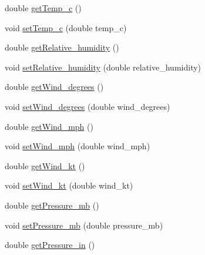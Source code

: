 \begin{DoxyCompactItemize}
\item 
double \hyperlink{classgov_1_1fnal_1_1ppd_1_1dd_1_1xml_1_1news_1_1current__observation_a09ac6676e3d02df8ddd1f7d01f4ee651}{get\-Temp\-\_\-c} ()
\item 
void \hyperlink{classgov_1_1fnal_1_1ppd_1_1dd_1_1xml_1_1news_1_1current__observation_a356c98dc1f0532700a57d135f8b9e1d1}{set\-Temp\-\_\-c} (double temp\-\_\-c)
\item 
double \hyperlink{classgov_1_1fnal_1_1ppd_1_1dd_1_1xml_1_1news_1_1current__observation_a3d00cbaf006d9ebf02333b42a9e37a81}{get\-Relative\-\_\-humidity} ()
\item 
void \hyperlink{classgov_1_1fnal_1_1ppd_1_1dd_1_1xml_1_1news_1_1current__observation_ac4d2748967563c32d98e4d6ab8bdd26a}{set\-Relative\-\_\-humidity} (double relative\-\_\-humidity)
\item 
double \hyperlink{classgov_1_1fnal_1_1ppd_1_1dd_1_1xml_1_1news_1_1current__observation_a68e1e24f506515463ee669410a5e5dd2}{get\-Wind\-\_\-degrees} ()
\item 
void \hyperlink{classgov_1_1fnal_1_1ppd_1_1dd_1_1xml_1_1news_1_1current__observation_ade1c187cc62e1bdc4742110ec057ecbc}{set\-Wind\-\_\-degrees} (double wind\-\_\-degrees)
\item 
double \hyperlink{classgov_1_1fnal_1_1ppd_1_1dd_1_1xml_1_1news_1_1current__observation_a531a5a34053c2e5dcae33abd9303b663}{get\-Wind\-\_\-mph} ()
\item 
void \hyperlink{classgov_1_1fnal_1_1ppd_1_1dd_1_1xml_1_1news_1_1current__observation_ad16885a0a2eee493864a5c7ca4ab4ca8}{set\-Wind\-\_\-mph} (double wind\-\_\-mph)
\item 
double \hyperlink{classgov_1_1fnal_1_1ppd_1_1dd_1_1xml_1_1news_1_1current__observation_a5b3e9c27e73f28d951046749d7731b85}{get\-Wind\-\_\-kt} ()
\item 
void \hyperlink{classgov_1_1fnal_1_1ppd_1_1dd_1_1xml_1_1news_1_1current__observation_ae7271ec6e18796d744be4ed4be0fbde6}{set\-Wind\-\_\-kt} (double wind\-\_\-kt)
\item 
double \hyperlink{classgov_1_1fnal_1_1ppd_1_1dd_1_1xml_1_1news_1_1current__observation_ab2e7e85473a317833e9455e8871f48af}{get\-Pressure\-\_\-mb} ()
\item 
void \hyperlink{classgov_1_1fnal_1_1ppd_1_1dd_1_1xml_1_1news_1_1current__observation_a021f0724c1ffce1d450671abd39679a7}{set\-Pressure\-\_\-mb} (double pressure\-\_\-mb)
\item 
double \hyperlink{classgov_1_1fnal_1_1ppd_1_1dd_1_1xml_1_1news_1_1current__observation_aadbeb554b793286231a94404eabc8383}{get\-Pressure\-\_\-in} ()

\end{DoxyCompactItemize}
